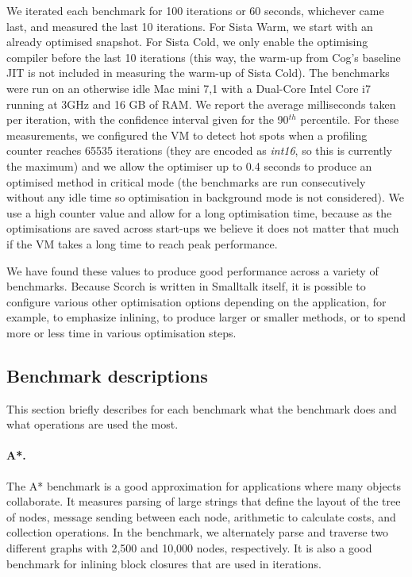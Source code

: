 \documentclass[a4paper,12pt,twoside]{../includes/ThesisStyle}
\begin{document}
We iterated each benchmark for 100 iterations or 60 seconds, whichever came last, and measured the last 10 iterations. For Sista Warm, we start with an already optimised snapshot. For Sista Cold, we only enable the optimising compiler before the last 10 iterations (this way, the warm-up from Cog's baseline JIT is not included in measuring the warm-up of Sista Cold). The benchmarks were run on an otherwise idle Mac mini 7,1 with a Dual-Core Intel Core i7 running at 3GHz and 16 GB of RAM. We report the average milliseconds taken per iteration, with the confidence interval given for the 90$^{th}$ percentile. For these measurements, we configured the VM to detect hot spots when a profiling counter reaches 65535 iterations (they are encoded as \emph{int16}, so this is currently the maximum) and we allow the optimiser up to 0.4 seconds to produce an optimised method in critical mode (the benchmarks are run consecutively without any idle time so optimisation in background mode is not considered). We use a high counter value and allow for a long optimisation time, because as the optimisations are saved across start-ups we believe it does not matter that much if the VM takes a long time to reach peak performance. 

We have found these values to produce good performance across a variety of benchmarks. Because Scorch is written in Smalltalk itself, it is possible to configure various other optimisation options depending on the application, for example, to emphasize inlining, to produce larger or smaller methods, or to spend more or less time in various optimisation steps. 

\subsection{Benchmark descriptions}

This section briefly describes for each benchmark what the benchmark does and what operations are used the most.

	\paragraph{A*.}The A* benchmark is a good approximation for applications where many objects collaborate. It measures parsing of large strings that define the layout of the tree of nodes, message sending between each node, arithmetic to calculate costs, and collection operations. In the benchmark, we alternately parse and traverse two different graphs with 2,500 and 10,000 nodes, respectively. It is also a good benchmark for inlining block closures that are used in iterations.
\end{document}
